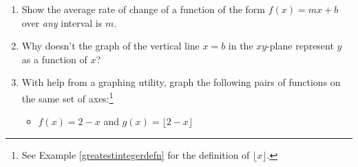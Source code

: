 \begin{enumerate}
\begin{enumerate}

\item  Find and interpret the average rate of change of $s$ over the following intervals:

\begin{multicols}{4}

\begin{enumerate}

\item $[14.9, 15]$

\item  $[15, 15.1]$

\item  $[14.99, 15]$

\item  $[15, 15.01]$

\end{enumerate}

\end{multicols}

\item  What value does the average rate of change appear to be approaching as the interval shrinks closer to the value $t=15$?

\item  Find the equation of the line containing $(15, 375)$ with slope $m = -50$ and graph it along with $s$ on the same set of axes using a graphing utility.  What happens as you zoom in near $(15, 375)$?

\end{enumerate}


\item  \label{lineshaveconstantratesofchange} Show the average rate of change of a function of the form $f(x) = mx+b$ over \textit{any} interval is $m$.

\item Why doesn't the graph of the vertical line $x = b$ in the $xy$-plane represent $y$ as a function of $x$?\label{whynoverticallineshere}

\item With help from a graphing utility, graph the following pairs of functions on the same set of axes:\footnote{See Example \ref{greatestintegerdefn} for the definition of $\lfloor x \rfloor$.}

\begin{multicols}{2}

\begin{itemize}


\item  $f(x) = 2-x$ and $g(x) = \lfloor 2-x \rfloor$


\end{itemize}
\end{multicols}
\end{enumerate}
